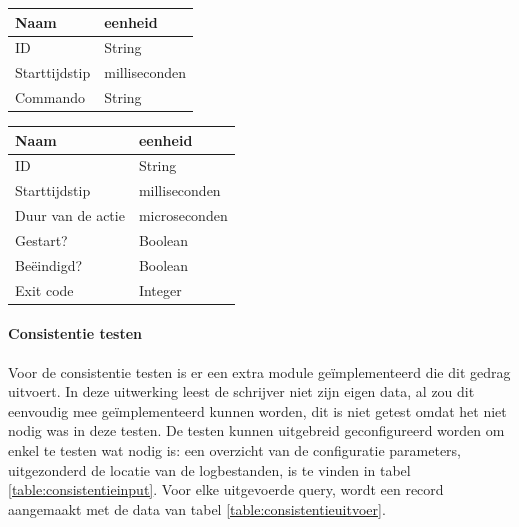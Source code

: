 \begin{minipage}[b]{0.5\textwidth}
		\begin{tabular}{l|l}
			\textbf{Naam} & \textbf{eenheid} \\ 
			\hline ID & String \\ 
			Starttijdstip & milliseconden \\ 
			Commando & String \\ 
		\end{tabular} 
	\label{table:beschikbaarheidinput}
\end{minipage}
\hfill
\begin{minipage}[b]{0.5\textwidth}

\begin{tabular}{l|l}
\textbf{Naam} & \textbf{eenheid} \\ 
\hline ID & String \\ 
Starttijdstip & milliseconden \\ 
Duur van de actie & microseconden \\
Gestart? & Boolean \\
Beëindigd? & Boolean \\
Exit code & Integer 
\end{tabular}
\label{table:beschikbaarheidoutput}
\end{minipage}

\paragraph{Consistentie testen} Voor de consistentie testen is er een extra module geïmplementeerd die dit gedrag uitvoert. In deze uitwerking leest de schrijver niet zijn eigen data, al zou dit eenvoudig mee geïmplementeerd kunnen worden, dit is niet getest omdat het niet nodig was in deze testen. De testen kunnen uitgebreid geconfigureerd worden om enkel te testen wat nodig is: een overzicht van de configuratie parameters, uitgezonderd de locatie van de logbestanden, is te vinden in tabel \ref{table:consistentieinput}. Voor elke uitgevoerde query, wordt een record aangemaakt met de data van tabel \ref{table:consistentieuitvoer}. 

